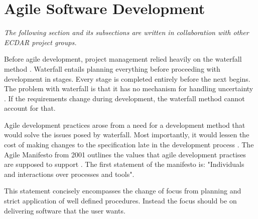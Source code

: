\section{Agile Software Development}\label{sec:agile-software-development}
\textit{The following section and its subsections are written in collaboration with other ECDAR project groups.}\vspace{1em}

Before agile development, project management relied heavily on the waterfall method \cite{sommerville}. 
Waterfall entails planning everything before proceeding with development in stages. 
Every stage is completed entirely before the next begins. 
The problem with waterfall is that it has no mechanism for handling uncertainty \cite{sommerville}. 
If the requirements change during development, the waterfall method cannot account for that. 

Agile development practices arose from a need for a development method that would solve the issues posed by waterfall. 
Most importantly, it would lessen the cost of making changes to the specification late in the development process \cite{alancline}. 
The Agile Manifesto from 2001 outlines the values that agile development practises are supposed to support \cite{beck2001agile}. 
The first statement of the manifesto is: "Individuals and interactions over processes and tools"\cite{beck2001agile}. 

This statement concisely encompasses the change of focus from planning and strict application of well defined procedures. 
Instead the focus should be on delivering software that the user wants.
